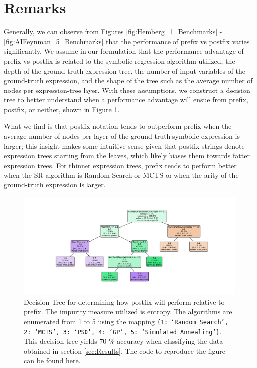 \documentclass[runningheads]{llncs}
\begin{document}
\section{Remarks}
Generally, we can observe from Figures \ref{fig:Hemberg_1_Benchmarks} - \ref{fig:AIFeynman_5_Benchmarks} that the performance of prefix vs postfix varies significantly. We assume in our formulation that the performance advantage of prefix vs postfix is related to the symbolic regression algorithm utilized, the depth of the ground-truth expression tree, the number of input variables of the ground-truth expression, and the shape of the tree such as the average number of nodes per expression-tree layer. With these assumptions, we construct a decision tree to better understand when a performance advantage will ensue from prefix, postfix, or neither, shown in Figure \ref{fig:PrefixPostfixDecisionTree}. 
\par What we find is that postfix notation tends to outperform prefix when the average number of nodes per layer of the ground-truth symbolic expression is larger; this insight makes some intuitive sense given that postfix strings denote expression trees starting from the leaves, which likely biases them towards fatter expression trees. For thinner expression trees, prefix tends to perform better when the SR algorithm is Random Search or MCTS or when the arity of the ground-truth expression is larger. 

\begin{figure}
    \centering
    \includegraphics[width=\linewidth]{PrefixPostfixDecisionTree.pdf}
    \caption{Decision Tree for determining how postfix will perform relative to prefix. The impurity measure utilized is entropy. The algorithms are enumerated from 1 to 5 using the mapping \texttt{\{1: `Random Search', 2: `MCTS', 3: `PSO', 4: `GP', 5: `Simulated Annealing'\}}. This decision tree yields 70 \% accuracy when classifying the data obtained in section \ref{sec:Results}. The code to reproduce the figure can be found \href{https://github.com/edfink234/Alpha-Zero-Symbolic-Regression/blob/ec9a0c72188606b3a03b9651b794a2f01f351854/PrefixPostfixDecisionTree.py}{here}. } 
    \label{fig:PrefixPostfixDecisionTree}
\end{figure}
\end{document}
